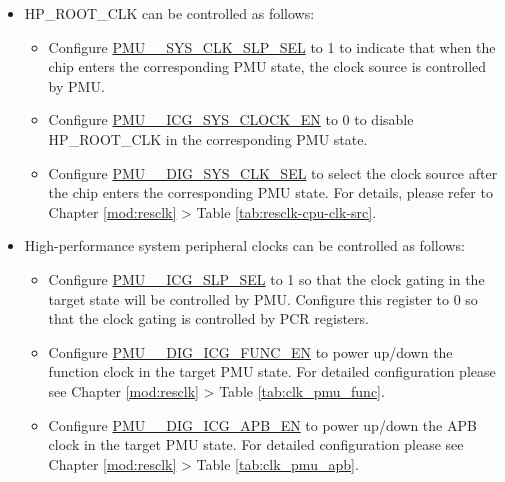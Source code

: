 \documentclass[main\_\_EN.tex]{subfiles}
\begin{document}
\begin{itemize}

\item HP\_ROOT\_CLK can be controlled as follows:

    \begin{itemize}
    \item Configure \hyperref[fielddesc:PMUHPACTIVESYSCLKSLPSEL]{PMU\_\_SYS\_CLK\_SLP\_SEL} to 1 to indicate that when the chip enters the corresponding PMU state, the clock source is controlled by PMU.

    \item Configure \hyperref[fielddesc:PMUHPACTIVEICGSYSCLOCKEN]{PMU\_\_ICG\_SYS\_CLOCK\_EN} to 0 to disable HP\_ROOT\_CLK in the corresponding PMU state.

    \item Configure \hyperref[fielddesc:PMUHPACTIVEDIGSYSCLKSEL]{PMU\_\_DIG\_SYS\_CLK\_SEL} to select the clock source after the chip enters the corresponding PMU state. For details, please refer to Chapter \ref{mod:resclk} \textit{} > Table \ref{tab:resclk-cpu-clk-src}.
    \end{itemize}

\item High-performance system peripheral clocks can be controlled as follows:

    \begin{itemize}
    \item Configure \hyperref[fielddesc:PMUHPACTIVEICGSLPSEL]{PMU\_\_ICG\_SLP\_SEL} to 1 so that the clock gating in the target state will be controlled by PMU. Configure this register to 0 so that the clock gating is controlled by PCR registers.

    \item Configure \hyperref[fielddesc:PMUHPACTIVEDIGICGFUNCEN]{PMU\_\_DIG\_ICG\_FUNC\_EN} to power up/down the function clock in the target PMU state. For detailed configuration please see Chapter \ref{mod:resclk} \textit{} > Table \ref{tab:clk_pmu_func}.

    \item Configure \hyperref[fielddesc:PMUHPACTIVEDIGICGAPBEN]{PMU\_\_DIG\_ICG\_APB\_EN} to power up/down the APB clock in the target PMU state. For detailed configuration please see Chapter \ref{mod:resclk} \textit{} > Table \ref{tab:clk_pmu_apb}.
    \end{itemize}

\end{itemize}
\end{document}
